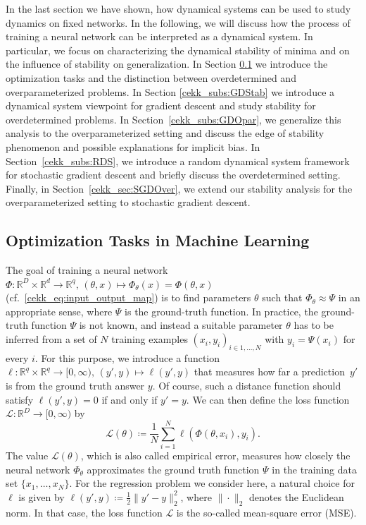 \documentclass[10pt]{article}
\newcommand{\R}{{\mathbb R}}
\def\R{\mathbb{R}}
\begin{document}
In the last section we have shown, how dynamical systems can be used to study dynamics on fixed networks. In the following, we will discuss how the process of training a neural network can be interpreted as a dynamical system. In particular, we focus on characterizing the dynamical stability of minima and on the influence of stability on generalization. In Section \ref{cekk_subs:opti} we introduce the optimization tasks and the distinction between overdetermined and overparameterized problems. In Section \ref{cekk_subs:GDStab} we introduce a dynamical system viewpoint for gradient descent and study stability for overdetermined problems. In Section~\ref{cekk_subs:GDOpar}, we generalize this analysis to the overparameterized setting and discuss the edge of stability phenomenon and possible explanations for implicit bias. In Section~\ref{cekk_subs:RDS}, we introduce a random dynamical system framework for stochastic gradient descent and briefly discuss the overdetermined setting. Finally, in Section~\ref{cekk_sec:SGDOver}, we extend our stability analysis for the overparameterized setting to stochastic gradient descent.

\subsection{Optimization Tasks in Machine Learning} \label{cekk_subs:opti}
The goal of training a neural network $\Phi: \R^D \times \R^d \to \R^q,\,(\theta, x) \mapsto \Phi_\theta(x) = \Phi(\theta,x)$ (cf.~\eqref{cekk_eq:input_output_map}) is to find parameters $\theta$ such that $\Phi_\theta \approx \Psi$ in an appropriate sense, where $\Psi$ is the ground-truth function. In practice, the ground-truth function $\Psi$ is not known, and instead a suitable parameter $\theta$ has to be inferred from a set of $N$ training examples $(x_i, y_i)_{i \in {1,\dots, N}}$ with $y_i = \Psi(x_i)$ for every $i$. For this purpose, we introduce a function $\ell: \R^q \times \R^q \to [0, \infty), \, (y',y) \mapsto \ell(y',y)$ that measures how far a prediction~$y'$ is from the ground truth answer $y$. Of course, such a distance function should satisfy $\ell(y',y) = 0$ if and only if $y'=y$. We can then define the loss function $\mathcal L: \mathbb R^D \to [0, \infty)$ by
\begin{equation}\label{cekk_eq:EmpLoss}
	\mathcal L(\theta) \coloneqq \frac{1}{N} \sum_{i = 1}^N \ell(\Phi(\theta, x_i), y_i).
\end{equation}
The value $\mathcal L(\theta)$, which is also called empirical error, measures how closely the neural network $\Phi_\theta$ approximates the ground truth function $\Psi$ in the training data set $\{x_1, \dots, x_N\}$.
For the regression problem we consider here, a natural choice for $\ell$ is given by $\ell(y',y) \coloneqq \frac{1}{2} \|y'-y\|_2^2$, where $\|\cdot\|_2$ denotes the Euclidean norm. In that case, the loss function $\mathcal L$ is the so-called mean-square error (MSE).
\end{document}
